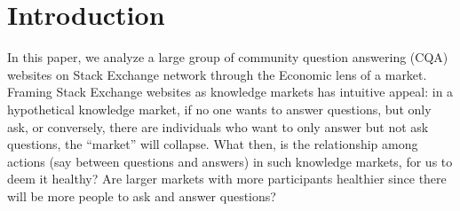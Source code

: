 

\section{Introduction}


In this paper, we analyze a large group of community question answering (CQA) websites on Stack Exchange network through the Economic lens of a market. Framing Stack Exchange websites as knowledge markets has intuitive appeal: in a hypothetical knowledge market, if no one wants to answer questions, but only ask, or conversely, there are individuals who want to only answer but not ask questions, the ``market'' will collapse. What then, is the relationship among actions (say between questions and answers) in such knowledge markets, for us to deem it healthy? Are larger markets with more participants healthier since there will be more people to ask and answer questions?

